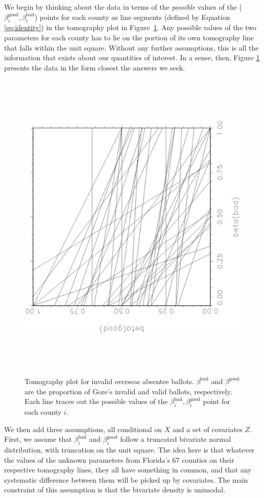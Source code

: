 \documentclass[11pt,titlepage]{article}
\newcommand{\bb}{\beta^{\text{bad}}}
\newcommand{\bg}{\beta^{\text{good}}}
\begin{document}
We begin by thinking about the data in terms of the \emph{possible}
values of the ($\bg_i,\bb_i$) points for each county as line segments
(defined by Equation \ref{eq:identity}) in the tomography plot in
Figure~\ref{fg:tomog}.  Any possible values of the two parameters for
each county has to lie on the portion of its own tomography line that
falls within the unit square.  Without any further assumptions, this
is all the information that exists about our quantities of interest.
In a sense, then, Figure \ref{fg:tomog} presents the data in the form
closest the answers we seek.
\begin{figure}[t]
\begin{center}
\includegraphics[width=4.5in,height=6in,angle=-90]{tomog}
\caption{\label{fg:tomog}
  Tomography plot for invalid overseas absentee ballots.  $\bb$ and
  $\bg$ are the proportion of Gore's invalid and valid ballots,
  respectively.  Each line traces out the possible values of the
  $\bb_i,\bg_i$ point for each county $i$.}
\end{center} 
\end{figure}

We then add three assumptions, all conditional on $X$ and a set of
covariates $Z$.  First, we assume that $\bb_i$ and $\bg_i$ follow a
truncated bivariate normal distribution, with truncation on the unit
square.  The idea here is that whatever the values of the unknown
parameters from Florida's 67 counties on their respective tomography
lines, they all have something in common, and that any systematic
difference between them will be picked up by covariates.  The main
constraint of this assumption is that the bivariate density is
unimodal.
\end{document}
